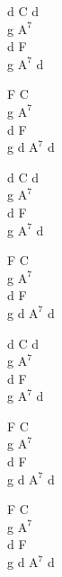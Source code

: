 \begin{chord}
    d C d\\
    g $\mathrm{A^7}$\\
    d F\\
    g $\mathrm{A^7}$ d

    F C\\
    g $\mathrm{A^7}$\\
    d F\\
    g d $\mathrm{A^7}$ d

    d C d\\
    g $\mathrm{A^7}$\\
    d F\\
    g $\mathrm{A^7}$ d

    F C\\
    g $\mathrm{A^7}$\\
    d F\\
    g d $\mathrm{A^7}$ d

    d C d\\
    g $\mathrm{A^7}$\\
    d F\\
    g $\mathrm{A^7}$ d

    F C\\
    g $\mathrm{A^7}$\\
    d F\\
    g d $\mathrm{A^7}$ d

    F C\\
    g $\mathrm{A^7}$\\
    d F\\
    g d $\mathrm{A^7}$ d
\end{chord}
